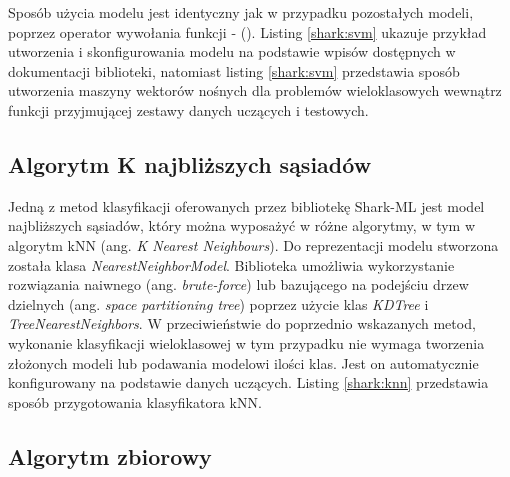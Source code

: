 Sposób użycia modelu jest identyczny jak w przypadku pozostałych modeli, poprzez operator wywołania funkcji - (). Listing \ref{shark:svm} ukazuje przykład utworzenia i skonfigurowania modelu na podstawie wpisów dostępnych w dokumentacji biblioteki, natomiast listing \ref{shark:svm} przedstawia sposób utworzenia maszyny wektorów nośnych dla problemów wieloklasowych wewnątrz funkcji przyjmującej zestawy danych uczących i testowych.



\subsection{Algorytm K najbliższych sąsiadów}

Jedną z metod klasyfikacji oferowanych przez bibliotekę Shark-ML jest model najbliższych sąsiadów, który można wyposażyć w różne algorytmy, w tym w algorytm kNN (ang. \textit{K Nearest Neighbours}). Do reprezentacji modelu stworzona została klasa \textit{NearestNeighborModel}. Biblioteka umożliwia wykorzystanie rozwiązania naiwnego (ang. \textit{brute-force}) lub bazującego na podejściu drzew dzielnych (ang. \textit{space partitioning tree}) poprzez użycie klas \textit{KDTree} i \textit{TreeNearestNeighbors}. W przeciwieństwie do poprzednio wskazanych metod, wykonanie klasyfikacji wieloklasowej w tym przypadku nie wymaga tworzenia złożonych modeli lub podawania modelowi ilości klas. Jest on automatycznie konfigurowany na podstawie danych uczących. Listing \ref{shark:knn} przedstawia sposób przygotowania klasyfikatora kNN.


\subsection{Algorytm zbiorowy}

